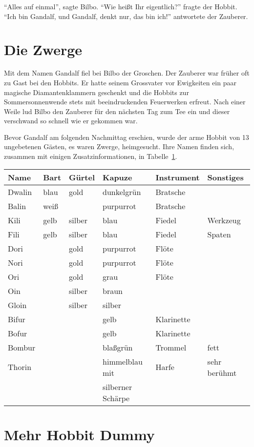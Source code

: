 \enquote{Alles auf einmal}, sagte Bilbo. \enquote{Wie heißt Ihr
  eigentlich?} fragte der Hobbit. \enquote{Ich bin Gandalf, und Gandalf,
denkt nur, das bin ich!} antwortete der Zauberer.
%
\section{Die Zwerge}
\label{sec:zwerge}
Mit dem Namen Gandalf fiel bei Bilbo der Groschen. Der Zauberer war
früher oft zu Gast bei den Hobbits. Er hatte seinem Grossvater vor
Ewigkeiten ein paar magische Diamantenklammern geschenkt und die
Hobbits zur Sommersonnenwende stets mit beeindruckenden Feuerwerken
erfreut. Nach einer Weile lud Bilbo den Zauberer für den nächsten Tag
zum Tee ein und dieser verschwand so schnell wie er gekommen war.
 
Bevor Gandalf am folgenden Nachmittag erschien, wurde der arme Hobbit
von 13 ungebetenen Gästen, es waren Zwerge, heimgesucht. Ihre Namen
finden sich, zusammen mit einigen Zusatzinformationen, in
Tabelle~\ref{tab:zwerge}.
% 
\begin{table}
  \centering
  \label{tab:zwerge}
  \begin{tabular}{l||l|l|l|l|l}
  Name   & Bart & Gürtel & Kapuze & Instrument & Sonstiges \\
  \hline
  Dwalin & blau & gold & dunkelgrün & Bratsche & \\
  Balin & weiß & & purpurrot & Bratsche & \\
  Kili & gelb & silber & blau & Fiedel & Werkzeug \\
  Fili & gelb & silber & blau & Fiedel & Spaten \\
  Dori & & gold & purpurrot & Flöte & \\
  Nori & & gold & purpurrot & Flöte & \\
  Ori & & gold & grau & Flöte & \\
  Oin & & silber & braun & & \\
  Gloin & & silber & silber & & \\
  Bifur & & & gelb & Klarinette & \\
  Bofur & & & gelb & Klarinette & \\
  Bombur & & & blaßgrün & Trommel & fett \\
  Thorin & & & himmelblau mit & Harfe & sehr berühmt \\
         & & & silberner Schärpe & &
  \end{tabular}
\end{table}
%
\section{Mehr Hobbit Dummy}
\blindtext[10]
